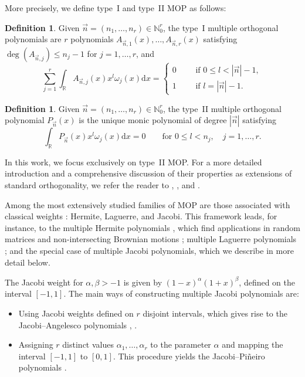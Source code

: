 \documentclass[11pt,reqno]{amsart}
\newcommand{\NN}{\mathbb{N}}
\newcommand{\RR}{\mathbb{R}}
\newcommand{\dr}{\mathrm{d}}
\theoremstyle{definition}
\newtheorem{definition}[theorem]{Definition}
\begin{document}
More precisely, we define type~I and type~II MOP as follows:

\begin{definition}
    Given $\vec n=(n_1,\dots,n_r)\in\NN_0^r$, the type~I multiple orthogonal polynomials are $r$ polynomials $A_{\vec n,1}(x),\dots,A_{\vec n,r}(x)$ satisfying $\deg(A_{\vec n,j})\leq n_j-1$ for $j=1,\dots,r$, and
    \begin{equation}
        \sum_{j=1}^r \int_\RR A_{\vec n,j}(x)x^l\omega_j(x)\dr x = \begin{cases}
            0\qquad \text{ if }0\leq l <|\vec n|-1,\\
            1\qquad \text{ if }l =|\vec n|-1.
        \end{cases}
    \end{equation}
\end{definition}

\begin{definition}
    Given $\vec n=(n_1,\dots,n_r)\in\NN_0^r$, the type~II multiple orthogonal polynomial $P_{\vec n}(x)$ is the unique monic polynomial of degree $|\vec n|$ satisfying
    \begin{equation}
        \label{eq:orthogonality-1-var}
        \int_\RR P_{\vec n}(x)x^l\omega_j(x)\dr x = 0\qquad \text{for }0\leq l<n_j,\quad j=1,\dots,r.
    \end{equation}
\end{definition}

In this work, we focus exclusively on type~II MOP. For a more detailed introduction and a comprehensive discussion of their properties as extensions of standard orthogonality, we refer the reader to \citep[Section 2]{FV26}, \citep[Section 23.1]{Ism05}, and \citep[Section 1]{VA20}.

Among the most extensively studied families of MOP are those associated with classical weights \citep{ABVA03}: Hermite, Laguerre, and Jacobi. This framework leads, for instance, to the multiple Hermite polynomials \citep{BK05}, which find applications in random matrices \citep{BK04} and non-intersecting Brownian motions \citep{DK07}; multiple Laguerre polynomials \citep{BK05}; and the special case of multiple Jacobi polynomials, which we describe in more detail below.

The Jacobi weight for $\alpha,\beta>-1$ is given by $(1-x)^\alpha(1+x)^\beta$, defined on the interval $[-1,1]$. The main ways of constructing multiple Jacobi polynomials are:
\begin{itemize}
    \item Using Jacobi weights defined on $r$ disjoint intervals, which gives rise to the Jacobi--Angelesco polynomials \citep{DS16}, \citep[Section 23.3.1]{Ism05}.
    
    \item Assigning $r$ distinct values $\alpha_1,\dots,\alpha_r$ to the parameter $\alpha$ and mapping the interval $[-1,1]$ to $[0,1]$. This procedure yields the Jacobi--Piñeiro polynomials \citep{BCVA05,Pin87}. 
\end{itemize}
\end{document}
